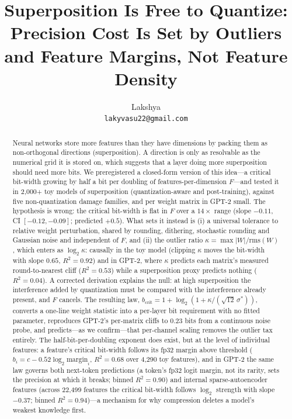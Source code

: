 \documentclass{article}
\title{Superposition Is Free to Quantize: \\ Precision Cost Is Set by Outliers and Feature Margins, Not Feature Density}
\author{%
  Lakshya \\
  \texttt{lakyvasu22@gmail.com}
}
\begin{document}
\maketitle

\begin{abstract}

Neural networks store more features than they have dimensions by packing them as non-orthogonal directions
(superposition). A direction is only as resolvable as the numerical grid it is stored on, which suggests that a layer doing
more superposition should need more bits. We preregistered a closed-form version of this idea---a critical bit-width
growing by half a bit per doubling of features-per-dimension $F$---and tested it in 2{,}000+ toy models of superposition
(quantization-aware and post-training), against five non-quantization damage families, and per weight matrix in GPT-2
small. The hypothesis is wrong: the critical bit-width is flat in $F$ over a $14\times$ range (slope $-0.11$, CI
$[-0.12,-0.09]$; predicted $+0.5$). What sets it instead is (i) a universal tolerance to relative weight perturbation, shared
by rounding, dithering, stochastic rounding and Gaussian noise and independent of $F$, and (ii) the outlier ratio
$\kappa=\max|W|/\mathrm{rms}(W)$, which enters as $\log_2\kappa$: causally in the toy model (clipping $\kappa$ moves the
bit-width with slope $0.65$, $R^2=0.92$) and in GPT-2, where $\kappa$ predicts each matrix's measured round-to-nearest cliff
($R^2=0.53$) while a superposition proxy predicts nothing ($R^2=0.04$). A corrected derivation explains the null: at high
superposition the interference added by quantization must be compared with the interference already present, and $F$
cancels. The resulting law, $b_{\mathrm{crit}} = 1+\log_2(1+\kappa/(\sqrt{12}\,\sigma^*))$, converts a one-line weight
statistic into a per-layer bit requirement with no fitted parameter, reproduces GPT-2's per-matrix cliffs to
$0.23$ bits from a continuous noise probe, and predicts---as we confirm---that per-channel scaling removes the outlier
tax entirely. The half-bit-per-doubling exponent does exist, but at the level of individual features: a feature's critical
bit-width follows its fp32 margin above threshold ($b_i = c - 0.52\log_2\mathrm{margin}_i$, $R^2=0.68$ over 4{,}290 toy
features), and in GPT-2 the same law governs both next-token predictions (a token's fp32 logit margin, not its rarity, sets the
precision at which it breaks; binned $R^2=0.90$) and internal sparse-autoencoder features (across 22{,}499 features the
critical bit-width follows $\log_2$ strength with slope $-0.37$; binned $R^2=0.94$)---a mechanism for why compression
deletes a model's weakest knowledge first.

\end{abstract}
\end{document}
